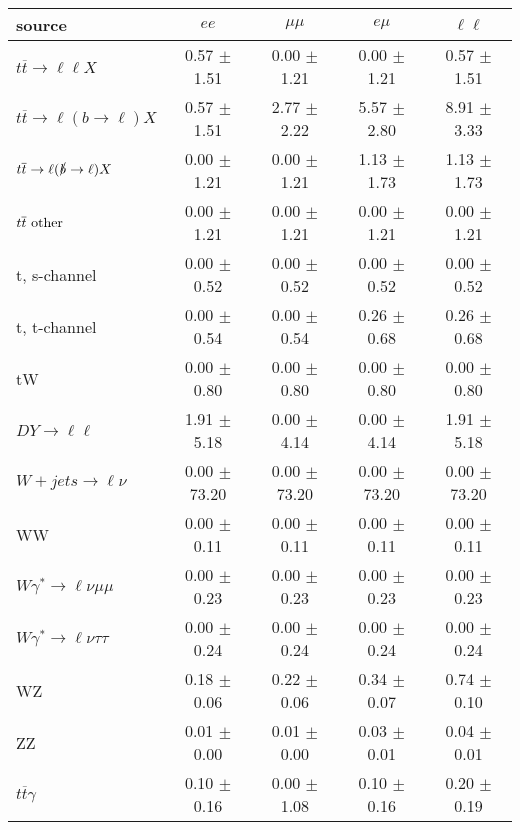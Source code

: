 \begin{tabular}{l|cccc} \hline\hline
source & $ee$ & $\mu\mu$ & $e\mu$ & $\ell\ell $ \\
\hline
$t\overline{t} \rightarrow \ell \ell X$ &  0.57 $\pm$  1.51 &  0.00 $\pm$  1.21 &  0.00 $\pm$  1.21 &  0.57 $\pm$  1.51 \\
$t\overline{t} \rightarrow \ell (b \rightarrow \ell) X$ &  0.57 $\pm$  1.51 &  2.77 $\pm$  2.22 &  5.57 $\pm$  2.80 &  8.91 $\pm$  3.33 \\
$t\overline{t} \rightarrow \ell (\slashed b \rightarrow \ell) X$ &  0.00 $\pm$  1.21 &  0.00 $\pm$  1.21 &  1.13 $\pm$  1.73 &  1.13 $\pm$  1.73 \\
        $t\overline{t}\ \rm{other}$ &  0.00 $\pm$  1.21 &  0.00 $\pm$  1.21 &  0.00 $\pm$  1.21 &  0.00 $\pm$  1.21 \\
\hline
                       t, s-channel &  0.00 $\pm$  0.52 &  0.00 $\pm$  0.52 &  0.00 $\pm$  0.52 &  0.00 $\pm$  0.52 \\
                       t, t-channel &  0.00 $\pm$  0.54 &  0.00 $\pm$  0.54 &  0.26 $\pm$  0.68 &  0.26 $\pm$  0.68 \\
                                 tW &  0.00 $\pm$  0.80 &  0.00 $\pm$  0.80 &  0.00 $\pm$  0.80 &  0.00 $\pm$  0.80 \\
\hline
         $DY \rightarrow \ell \ell$ &  1.91 $\pm$  5.18 &  0.00 $\pm$  4.14 &  0.00 $\pm$  4.14 &  1.91 $\pm$  5.18 \\
      $W+jets \rightarrow \ell \nu$ &  0.00 $\pm$ 73.20 &  0.00 $\pm$ 73.20 &  0.00 $\pm$ 73.20 &  0.00 $\pm$ 73.20 \\
                                 WW &  0.00 $\pm$  0.11 &  0.00 $\pm$  0.11 &  0.00 $\pm$  0.11 &  0.00 $\pm$  0.11 \\
\hline
$W\gamma^{*} \rightarrow \ell \nu \mu\mu$ &  0.00 $\pm$  0.23 &  0.00 $\pm$  0.23 &  0.00 $\pm$  0.23 &  0.00 $\pm$  0.23 \\
$W\gamma^{*} \rightarrow \ell \nu \tau\tau$ &  0.00 $\pm$  0.24 &  0.00 $\pm$  0.24 &  0.00 $\pm$  0.24 &  0.00 $\pm$  0.24 \\
                                 WZ &  0.18 $\pm$  0.06 &  0.22 $\pm$  0.06 &  0.34 $\pm$  0.07 &  0.74 $\pm$  0.10 \\
                                 ZZ &  0.01 $\pm$  0.00 &  0.01 $\pm$  0.00 &  0.03 $\pm$  0.01 &  0.04 $\pm$  0.01 \\
\hline
              $t\overline{t}\gamma$ &  0.10 $\pm$  0.16 &  0.00 $\pm$  1.08 &  0.10 $\pm$  0.16 &  0.20 $\pm$  0.19 \\

\end{tabular}
